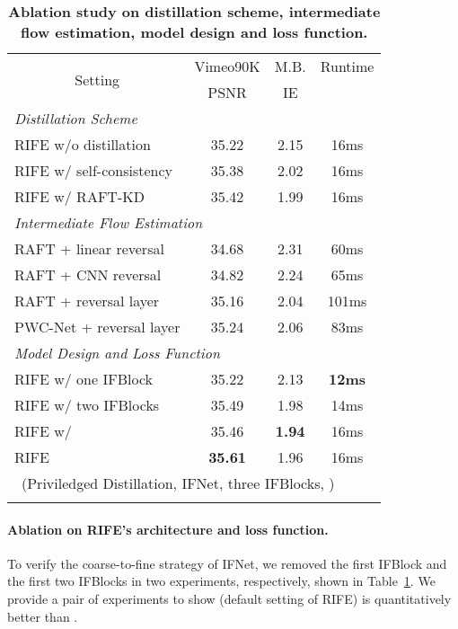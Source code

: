 \documentclass[final]{cvpr}
\def\red#1{\textcolor{MyRed}{#1}}
\def\first#1{\red{\textbf{#1}}}
\begin{document}
\begin{table}[t]
	\caption{\textbf{Ablation study on distillation scheme, intermediate flow estimation, model design and loss function.}}
	\small
	\begin{tabular}{lccc}
		\hline
		\multicolumn{1}{c}{\multirow{2}{*}{Setting}} & \multicolumn{1}{c}{Vimeo90K} & \multicolumn{1}{c}{M.B.} & \multicolumn{1}{c}{Runtime} \\ 
		\multicolumn{1}{c}{}                         & \multicolumn{1}{c}{PSNR}   & \multicolumn{1}{c}{IE}     & \multicolumn{1}{c}{}            \\ \hline 
		\multicolumn{4}{l}{\emph{Distillation Scheme}}\\
		RIFE w/o distillation & 35.22 & 2.15 & 16ms\\
		RIFE w/ self-consistency & 35.38 & 2.02 & 16ms\\
		RIFE w/ RAFT-KD & {35.42} & {1.99} & 16ms\\ \hline
\multicolumn{4}{l}{\emph{Intermediate Flow Estimation}}\\
		RAFT + linear reversal & 34.68 & 2.31 & {60ms} \\
		RAFT + CNN reversal &  34.82 & 2.24 & 65ms \\
		RAFT + reversal layer &  35.16 & {2.04} & 101ms \\
		PWC-Net + reversal layer &  {35.24} & 2.06 & 83ms \\ \hline
\multicolumn{4}{l}{\emph{Model Design and Loss Function}}\\
		RIFE w/ one IFBlock & 35.22 & 2.13 & \first{12ms}\\ 
		RIFE w/ two IFBlocks & {35.49} & {1.98} & 14ms\\ 
		RIFE w/  & {35.46} & \first{1.94} & 16ms \\
\hline \hline
		RIFE& \first{35.61} & {1.96} & 16ms \\
		\multicolumn{4}{l}{~(Priviledged Distillation, IFNet, three IFBlocks, )}\\
		\hline 
		\normalsize
	\end{tabular}
\label{tab:ablation2}
\end{table}

\paragraph{Ablation on RIFE's architecture and loss function.}To verify the coarse-to-fine strategy of IFNet, we removed the first IFBlock and the first two IFBlocks in two experiments, respectively, shown in Table~\ref{tab:ablation2}. We provide a pair of experiments to show  (default setting of RIFE) is quantitatively better than . 
\end{document}
